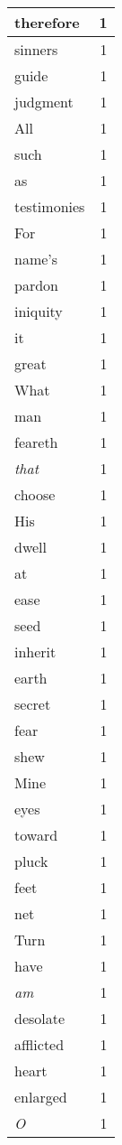 \begin{center}
\begin{longtable}{l|r}
therefore & 1 \\ \hline
sinners & 1 \\ \hline
guide & 1 \\ \hline
judgment & 1 \\ \hline
All & 1 \\ \hline
such & 1 \\ \hline
as & 1 \\ \hline
testimonies & 1 \\ \hline
For & 1 \\ \hline
name's & 1 \\ \hline
pardon & 1 \\ \hline
iniquity & 1 \\ \hline
it & 1 \\ \hline
great & 1 \\ \hline
What & 1 \\ \hline
man & 1 \\ \hline
feareth & 1 \\ \hline
\emph{that} & 1 \\ \hline
choose & 1 \\ \hline
His & 1 \\ \hline
dwell & 1 \\ \hline
at & 1 \\ \hline
ease & 1 \\ \hline
seed & 1 \\ \hline
inherit & 1 \\ \hline
earth & 1 \\ \hline
secret & 1 \\ \hline
fear & 1 \\ \hline
shew & 1 \\ \hline
Mine & 1 \\ \hline
eyes & 1 \\ \hline
toward & 1 \\ \hline
pluck & 1 \\ \hline
feet & 1 \\ \hline
net & 1 \\ \hline
Turn & 1 \\ \hline
have & 1 \\ \hline
\emph{am} & 1 \\ \hline
desolate & 1 \\ \hline
afflicted & 1 \\ \hline
heart & 1 \\ \hline
enlarged & 1 \\ \hline
\emph{O} & 1 \\ \hline

\end{longtable}
\end{center}
